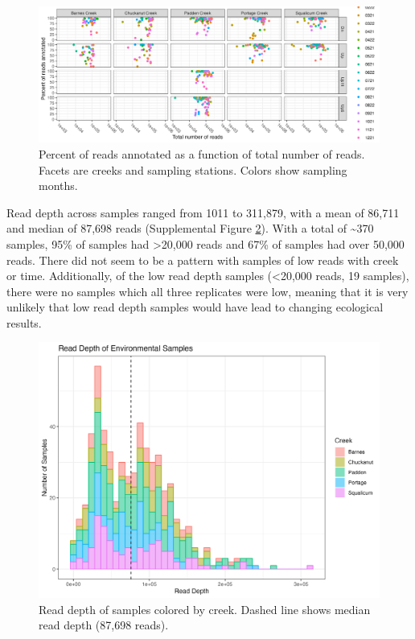 \documentclass[
]{article}
\begin{document}
\begin{figure}
\centering
\includegraphics{../Output/SupplementalFigures/percentannotatedbytime.png}
\caption{Percent of reads annotated as a function of total number of
reads. Facets are creeks and sampling stations. Colors show sampling
months.\label{fig:pannot}}
\end{figure}

Read depth across samples ranged from 1011 to 311,879, with a mean of
86,711 and median of 87,698 reads (Supplemental Figure
\ref{fig:readdepth}). With a total of \textasciitilde370 samples, 95\%
of samples had \textgreater20,000 reads and 67\% of samples had over
50,000 reads. There did not seem to be a pattern with samples of low
reads with creek or time. Additionally, of the low read depth samples
(\textless20,000 reads, 19 samples), there were no samples which all
three replicates were low, meaning that it is very unlikely that low
read depth samples would have lead to changing ecological results.

\begin{figure}
\centering
\includegraphics{../Output/SupplementalFigures/read_depths.png}
\caption{Read depth of samples colored by creek. Dashed line shows
median read depth (87,698 reads).\label{fig:readdepth}}
\end{figure}
\end{document}
